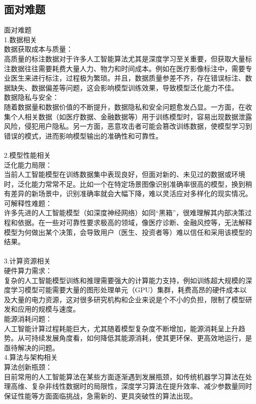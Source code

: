 \documentclass[supercite]{Experimental_Report}
\theoremstyle{definition}
\begin{document}
	\subsection{面对难题}
	面对难题\\
	1.数据相关\\
	数据获取成本与质量：\\高质量的标注数据对于许多人工智能算法尤其是深度学习至关重要，但获取大量标注数据往往需要耗费大量人力、物力和时间成本。例如在医疗影像标注中，需要专业医生来进行标注，过程极为繁琐。并且，数据质量参差不齐，存在错误标注、数据缺失、数据偏差等问题，这会影响模型训练效果，导致模型泛化能力不佳。\\
	数据隐私与安全：\\随着数据量和数据价值的不断提升，数据隐私和安全问题愈发凸显。一方面，在收集个人相关数据（如医疗数据、金融数据等）用于训练模型时，容易出现数据泄露风险，侵犯用户隐私。另一方面，恶意攻击者可能会篡改训练数据，使模型学习到错误的模式，进而影响模型输出的准确性和可靠性。\\
	\\2.模型性能相关\\
	泛化能力局限：\\当前人工智能模型在训练数据集中表现良好，但面对新的、未见过的数据或环境时，泛化能力常常不足。比如一个在特定场景图像识别准确率很高的模型，换到稍有差异的新场景中，识别准确率就会大幅下降，难以灵活应对多样化的现实情况。\\
	可解释性难题：\\许多先进的人工智能模型（如深度神经网络）如同“黑箱”，很难理解其内部决策过程和依据。在一些对可靠性要求极高的领域，像医疗诊断、金融风控等，无法解释模型为何做出某个决策，会导致用户（医生、投资者等）难以信任和采用该模型的结果。\\
	\\3.计算资源相关\\
	硬件算力需求：\\复杂的人工智能模型训练和推理需要强大的计算能力支持，例如训练超大规模的深度学习模型可能需要大量的图形处理单元（GPU）集群，耗费高昂的硬件成本以及大量的电力资源，这对很多研究机构和企业来说是个不小的负担，限制了模型研发和应用的规模与速度。\\
	能源消耗问题：\\人工智能计算过程耗能巨大，尤其随着模型复杂度不断增加，能源消耗呈上升趋势。从可持续发展角度看，如何降低其能源消耗，使其更环保、更高效地运行，是亟待解决的问题。
	\\4.算法与架构相关\\
	算法创新瓶颈：\\目前常用的人工智能算法在某些方面逐渐遇到发展瓶颈，如传统机器学习算法在处理高维、复杂非线性数据时的局限性，深度学习算法在提升效率、减少参数量同时保证性能等方面面临挑战，急需新的、更具突破性的算法出现。\\
\end{document}
